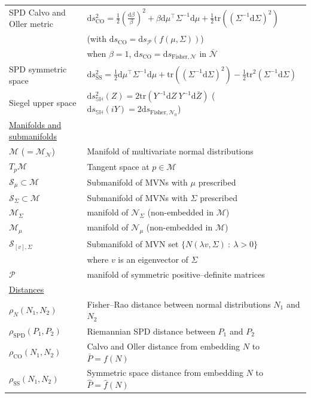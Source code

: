 \documentclass[entropy,article,accept,oneauthor,pdftex,entropy]{Definitions/mdpi}
\def\hatP{{\hat{P}}}
\def\calS{\mathcal{S}}
\def\calM{\mathcal{M}}
\def\SH{\mathbb{SH}}
\def\dZ{\mathrm{d}Z}
\def\dZbar{\mathrm{d}\bar Z}
\def\barN{{\overline{\mathcal{N}}}}
\def\CO{\mathrm{CO}}
\def\SPD{\mathrm{SPD}}
\def\Fisher{\mathrm{Fisher}}
\def\tr{\mathrm{tr}}
\def\calN{\mathcal{N}}
\def\SPD{\mathrm{SPD}}
\def\calP{\mathcal{P}}
\def\SS{\mathrm{SS}}
\def\dbeta{\mathrm{d}\beta}
\def\barP{{\bar P}}
\def\dSigma{\mathrm{d}\Sigma}
\def\dmu{\mathrm{d}\mu}
\def\ds{\mathrm{d}s}
\def\st{\ :\ }
\begin{document}
{\begin{tabular}{@{}p{4.1cm}l}
SPD Calvo and Oller metric & $\ds^2_\CO=\frac{1}{2}\left(\frac{\dbeta}{\beta}\right)^2 + \beta\dmu^\top \Sigma^{-1}\dmu+\frac{1}{2}\tr\left(\left(\Sigma^{-1}\dSigma\right)^2\right)$\\
 & (with $\ds_\CO=\ds_{\calP}(f(\mu,\Sigma))$) \\
 & when $\beta=1$, $\ds_\CO=\ds_{\Fisher,\calN}$ in $\barN$\\
SPD symmetric space & $\ds_\SS^2=\frac{1}{2}\dmu^\top \Sigma^{-1} \dmu +\tr\left(\left(\Sigma^{-1}\dSigma\right)^2\right)-\frac{1}{2}\tr^2\left(\Sigma^{-1}\dSigma\right)$ \\
Siegel upper space & $\ds_\SH^2 (Z) = 2 \tr\left(Y^{-1}\dZ\ Y^{-1}\dZbar\right)$ ($\ds_\SH(iY)=2\ds_{\Fisher,\calN_0}$)\\
%
\underline{Manifolds and submanifolds} & \\
$\calM$ ($=\calM_{\calN}$) & Manifold of multivariate normal distributions\\
$T_p\calM$ & Tangent space at $p\in\calM$\\
$\calS_\mu\subset \calM$ & Submanifold  of MVNs with $\mu$ prescribed\\
$\calS_\Sigma\subset \calM$ & Submanifold  of MVNs with $\Sigma$ prescribed\\
$\calM_\Sigma$ & manifold of $\calN_\Sigma$ (non-embedded in $\calM$)\\
$\calM_\mu$ &  manifold of $\calN_\mu$ (non-embedded in $\calM$)\\
$\calS_{[v],\Sigma}$ & Submanifold of MVN set $\{N(\lambda v,\Sigma)\st \lambda>0\}$ \\
 & where $v$ is an eigenvector of $\Sigma$\\
$\calP$ & manifold of symmetric positive–definite matrices\\
%
\underline{Distances} & \\
$\rho_N(N_1,N_2)$ & Fisher–Rao distance between normal distributions $N_1$ and $N_2$\\
$\rho_{\SPD}(P_1,P_2)$ & Riemannian SPD distance between  $P_1$ and $P_2$\\
$\rho_\CO(N_1,N_2)$ & Calvo and Oller distance from embedding $N$ to $\barP=f(N)$\\
$\rho_\SS(N_1,N_2)$ & Symmetric space distance from embedding $N$ to $\hatP=\hat{f}(N)$\\

\end{tabular}}
\end{document}
